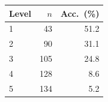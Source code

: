 \begin{tabular}{lrr}
\toprule
Level & $n$ & Acc.\ (\%) \\
\midrule
1 & 43 & 51.2 \\
2 & 90 & 31.1 \\
3 & 105 & 24.8 \\
4 & 128 & 8.6 \\
5 & 134 & 5.2 \\
\bottomrule
\end{tabular}
